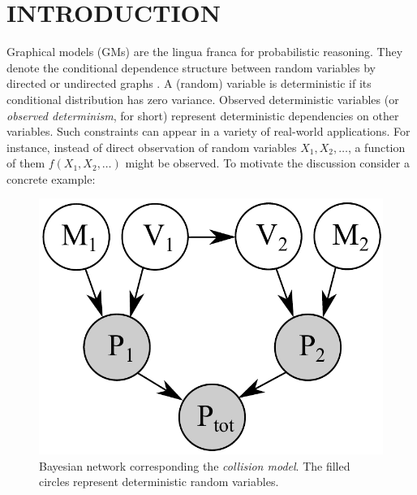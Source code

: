 \documentclass[]{article}
\begin{document}
\section{INTRODUCTION}
\label{sect:intro}
Graphical models (GMs) are the lingua franca for probabilistic reasoning.
They denote the conditional dependence structure between random variables by directed or undirected graphs \citep{koller2009probabilistic}. 
A (random) variable is deterministic if its conditional distribution has zero variance. 
Observed deterministic variables (or \emph{observed determinism}, for short) represent deterministic dependencies on other variables.
Such constraints can appear in a variety of real-world applications.
For instance, instead of direct observation of random variables 
$X_1, X_2, \ldots$, a function of them $f(X_1, X_2, \ldots)$ might be observed. 
To motivate the discussion consider a concrete example:  
\begin{figure}[t!]
\vspace{-3mm}
\begin{center}
 \includegraphics[width=0.33\linewidth]{Figs/little-momentum1.pdf} 
\end{center}
\vspace{-6mm}
\caption{\footnotesize
Bayesian network corresponding the \emph{collision model}. The filled circles represent deterministic random variables.} 
\label{fig:mom0}
\vspace{-2mm}
\end{figure}
\end{document}
